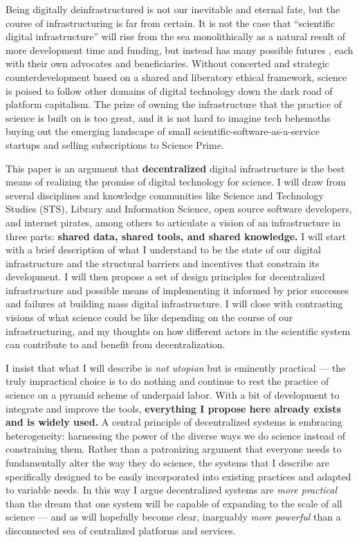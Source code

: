 \documentclass[10pt]{article}
\begin{document}
\begin{multicols}{2}
Being digitally deinfrastructured is not our inevitable and eternal
fate, but the course of infrastructuring is far from certain. It is not
the case that ``scientific digital infrastructure'' will rise from the
sea monolithically as a natural result of more development time and
funding, but instead has many possible futures\cite{mirowskiFutureOpenScience2018} , each with their own advocates and
beneficiaries. Without concerted and strategic counterdevelopment based
on a shared and liberatory ethical framework, science is poised to
follow other domains of digital technology down the dark road of
platform capitalism. The prize of owning the infrastructure that the
practice of science is built on is too great, and it is not hard to
imagine tech behemoths buying out the emerging landscape of small
scientific-software-as-a-service startups and selling subscriptions to
Science Prime.

This paper is an argument that \textbf{decentralized} digital
infrastructure is the best means of realizing the promise of digital
technology for science. I will draw from several disciplines and
knowledge communities like Science and Technology Studies (STS), Library
and Information Science, open source software developers, and internet
pirates, among others to articulate a vision of an infrastructure in
three parts: \textbf{shared data, shared tools, and shared knowledge.} I
will start with a brief description of what I understand to be the state
of our digital infrastructure and the structural barriers and incentives
that constrain its development. I will then propose a set of design
principles for decentralized infrastructure and possible means of
implementing it informed by prior successes and failures at building
mass digital infrastructure. I will close with contrasting visions of
what science could be like depending on the course of our
infrastructuring, and my thoughts on how different actors in the
scientific system can contribute to and benefit from decentralization.

I insist that what I will describe is \emph{not utopian} but is
eminently practical --- the truly impractical choice is to do nothing
and continue to rest the practice of science on a pyramid scheme \cite{ponziSciencePyramidScheme2020}  of underpaid labor. With a bit
of development to integrate and improve the tools, \textbf{everything I
propose here already exists and is widely used.} A central principle of
decentralized systems is embracing heterogeneity: harnessing the power
of the diverse ways we do science instead of constraining them. Rather
than a patronizing argument that everyone needs to fundamentally alter
the way they do science, the systems that I describe are specifically
designed to be easily incorporated into existing practices and adapted
to variable needs. In this way I argue decentralized systems are
\emph{more practical} than the dream that one system will be capable of
expanding to the scale of all science --- and as will hopefully become
clear, inarguably \emph{more powerful} than a disconnected sea of
centralized platforms and services.


\end{multicols}
\end{document}
